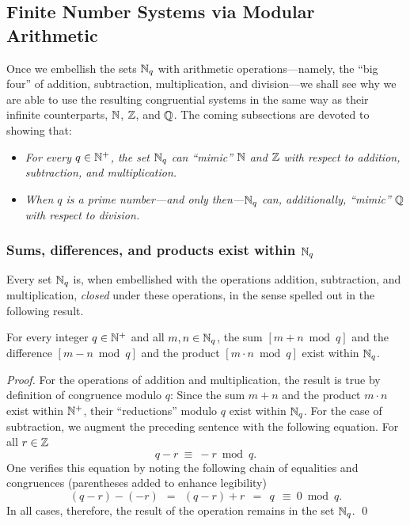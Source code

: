 \subsection{Finite Number Systems via Modular Arithmetic}
\label{sec:modular}

Once we embellish the sets $\mathbb{N}_q$ with arithmetic operations---namely, the ``big four'' of addition, subtraction, multiplication, and division---we shall see why we are able to use the resulting
congruential systems in the same way as their infinite counterparts, $\mathbb{N}$, $\mathbb{Z}$, and $\mathbb{Q}$.  The coming subsections are devoted to showing that:
\begin{itemize}
\item
{\em For every $q \in \mathbb{N}^+$, the set $\mathbb{N}_q$ can ``mimic'' $\mathbb{N}$ and $\mathbb{Z}$ with respect to addition, subtraction, and multiplication.}
\item
{\em When $q$ is a prime number---and only then---$\mathbb{N}_q$ can, additionally, ``mimic'' $\mathbb{Q}$ with respect to division.}
\end{itemize}

\subsubsection{Sums, differences, and products exist within $\mathbb{N}_q$}
\label{sec:modular-add-sub-mult}


Every set $\mathbb{N}_q$ is, when embellished with the operations addition, subtraction, and multiplication, {\em closed} under these operations, in the sense spelled out in the following result.

\begin{prop}
\label{thm:modular-add-sub-mult}
For every integer $q \in \mathbb{N}^+$ and all $m,n \in \mathbb{N}_q$, the sum $[m+n \bmod q]$ and the difference $[m-n \bmod q]$ and the product $[m \cdot n \bmod q]$ exist within $\mathbb{N}_q$.
\end{prop}

\begin{proof}
For the operations of addition and multiplication, the result is true by definition of congruence modulo $q$:  Since the sum $m+n$ and the product $m \cdot n$ exist within $\mathbb{N}^+$, their ``reductions'' modulo $q$ exist within $\mathbb{N}_q$.  For the case of subtraction, we augment the
preceding sentence with the following equation.  For all $r \in \mathbb{Z}$
\[ q-r \ \equiv \ -r \bmod q. \]
One verifies this equation by noting the following chain of equalities and congruences (parentheses added to enhance legibility)
\[ (q-r) - (-r) \ \ = \ \ (q-r) + r \ \ = \ \ q \ \ \equiv \ 0 \bmod q. \] 
In all cases, therefore, the result of the operation remains in the set $\mathbb{N}_q$.
\qed
\end{proof}

